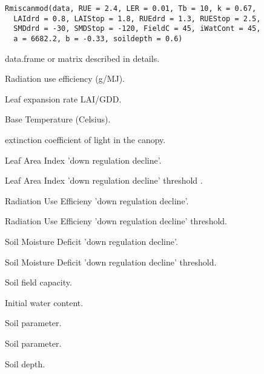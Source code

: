 \documentclass[letterpaper]{book}
\begin{document}
%
\begin{Usage}
\begin{verbatim}
Rmiscanmod(data, RUE = 2.4, LER = 0.01, Tb = 10, k = 0.67,
  LAIdrd = 0.8, LAIStop = 1.8, RUEdrd = 1.3, RUEStop = 2.5,
  SMDdrd = -30, SMDStop = -120, FieldC = 45, iWatCont = 45,
  a = 6682.2, b = -0.33, soildepth = 0.6)
\end{verbatim}
\end{Usage}
%
\begin{Arguments}
\begin{ldescription}
\item[\code{data}] data.frame or matrix described in details.

\item[\code{RUE}] Radiation use efficiency (g/MJ).

\item[\code{LER}] Leaf expansion rate LAI/GDD.

\item[\code{Tb}] Base Temperature (Celsius).

\item[\code{k}] extinction coefficient of light in the canopy.

\item[\code{LAIdrd}] Leaf Area Index 'down regulation decline'.

\item[\code{LAIStop}] Leaf Area Index 'down regulation decline'
threshold .

\item[\code{RUEdrd}] Radiation Use Efficieny 'down regulation
decline'.

\item[\code{RUEStop}] Radiation Use Efficieny 'down regulation
decline' threshold.

\item[\code{SMDdrd}] Soil Moisture Deficit 'down regulation
decline'.

\item[\code{SMDStop}] Soil Moisture Deficit 'down regulation
decline' threshold.

\item[\code{FieldC}] Soil field capacity.

\item[\code{iWatCont}] Initial water content.

\item[\code{a}] Soil parameter.

\item[\code{b}] Soil parameter.

\item[\code{soildepth}] Soil depth.
\end{ldescription}
\end{Arguments}
\end{document}
